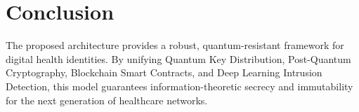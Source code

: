 \documentclass[conference]{IEEEtran}
\begin{document}
\section{Conclusion}
The proposed architecture provides a robust, quantum-resistant framework for digital health identities. By unifying Quantum Key Distribution, Post-Quantum Cryptography, Blockchain Smart Contracts, and Deep Learning Intrusion Detection, this model guarantees information-theoretic secrecy and immutability for the next generation of healthcare networks.


\end{document}
